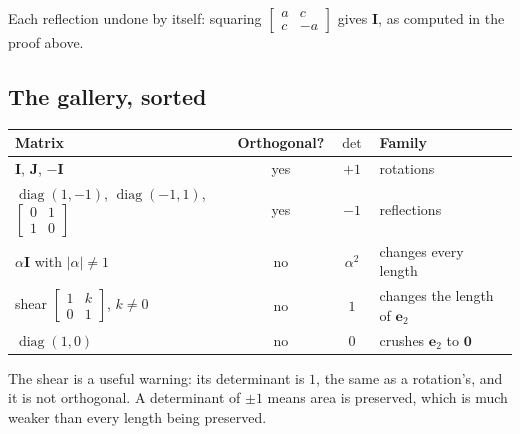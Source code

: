 \documentclass[11pt]{article}
\theoremstyle{plain}
\theoremstyle{definition}
\theoremstyle{remark}
\newcommand{\vc}[1]{\mathbf{#1}}
\newcommand{\mt}[1]{\mathbf{#1}}
\DeclareMathOperator{\diagop}{diag}
\newcommand{\smat}[1]{\left[\begin{smallmatrix}#1\end{smallmatrix}\right]}
\begin{document}
Each reflection undone by itself: squaring
$\begin{bmatrix}a&c\\c&-a\end{bmatrix}$ gives $\mt{I}$, as computed in the
proof above.

\subsection{The gallery, sorted}
\begin{center}
\renewcommand{\arraystretch}{1.4}
\begin{tabular}{@{}l c c l@{}}
\toprule
\textbf{Matrix} & \textbf{Orthogonal?} & $\det$ & \textbf{Family} \\
\midrule
$\mt{I}$, $\mt{J}$, $-\mt{I}$ & yes & $+1$ & rotations \\
$\diagop(1,-1)$, $\diagop(-1,1)$, $\smat{0&1\\1&0}$ & yes & $-1$ & reflections \\
$\alpha\mt{I}$ with $|\alpha|\neq1$ & no & $\alpha^{2}$ & changes every length \\
shear $\smat{1&k\\0&1}$, $k\neq0$ & no & $1$ & changes the length of $\vc{e}_2$ \\
$\diagop(1,0)$ & no & $0$ & crushes $\vc{e}_2$ to $\vc{0}$ \\
\bottomrule
\end{tabular}
\end{center}

\noindent The shear is a useful warning: its determinant is $1$, the same as a
rotation's, and it is not orthogonal. A determinant of $\pm1$ means area is
preserved, which is much weaker than every length being preserved.

\end{document}
